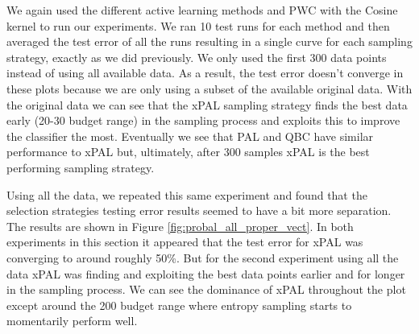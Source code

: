 We again used the different active learning methods and PWC with the Cosine kernel to run our experiments. We ran 10 test runs for each method and then averaged the test error of all the runs resulting in a single curve for each sampling strategy, exactly as we did previously. We only used the first 300 data points instead of using all available data. As a result, the test error doesn't converge in these plots because we are only using a subset of the available original data. With the original data we can see that the xPAL sampling strategy finds the best data early (20-30 budget range) in the sampling process and exploits this to improve the classifier the most. Eventually we see that PAL and QBC have similar performance to xPAL but, ultimately, after 300 samples xPAL is the best performing sampling strategy.

Using all the data, we repeated this same experiment and found that the selection strategies testing error results seemed to have a bit more separation. The results are shown in Figure \ref{fig:probal_all_proper_vect}. In both experiments in this section it appeared that the test error for xPAL was converging to around roughly 50\%. But for the second experiment using all the data xPAL was finding and exploiting the best data points earlier and for longer in the sampling process. We can see the dominance of xPAL throughout the plot except around the 200 budget range where entropy sampling starts to momentarily perform well.


